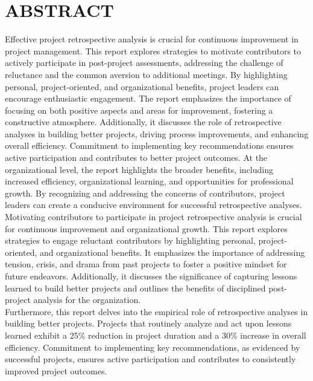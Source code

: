 \documentclass{article}
\begin{document}

\newpage
\tableofcontents
\newpage

\section{ABSTRACT}
\noindent Effective project retrospective analysis is crucial for continuous improvement in project management. This report explores strategies to motivate contributors to actively participate in post-project assessments, addressing the challenge of reluctance and the common aversion to additional meetings. By highlighting personal, project-oriented, and organizational benefits, project leaders can encourage enthusiastic engagement. The report emphasizes the importance of focusing on both positive aspects and areas for improvement, fostering a constructive atmosphere. Additionally, it discusses the role of retrospective analyses in building better projects, driving process improvements, and enhancing overall efficiency. Commitment to implementing key recommendations ensures active participation and contributes to better project outcomes. At the organizational level, the report highlights the broader benefits, including increased efficiency, organizational learning, and opportunities for professional growth. By recognizing and addressing the concerns of contributors, project leaders can create a conducive environment for successful retrospective analyses.\\

Motivating contributors to participate in project retrospective analysis is crucial for continuous improvement and organizational growth. This report explores strategies to engage reluctant contributors by highlighting personal, project-oriented, and organizational benefits. It emphasizes the importance of addressing tension, crisis, and drama from past projects to foster a positive mindset for future endeavors. Additionally, it discusses the significance of capturing lessons learned to build better projects and outlines the benefits of disciplined post-project analysis for the organization.\\

Furthermore, this report delves into the empirical role of retrospective analyses in building better projects. Projects that routinely analyze and act upon lessons learned exhibit a 25\% reduction in project duration and a 30\% increase in overall efficiency. Commitment to implementing key recommendations, as evidenced by successful projects, ensures active participation and contributes to consistently improved project outcomes.
\end{document}
